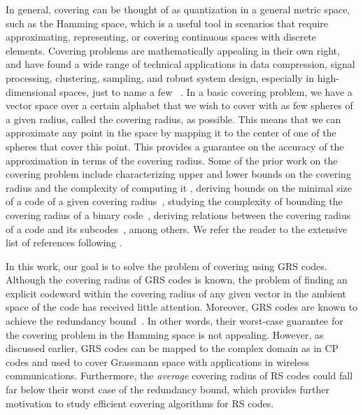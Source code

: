 \documentclass[conference]{IEEEtran}
\begin{document}

In general, covering can be thought of as quantization in a general metric space, such as the Hamming space, which is a useful tool in scenarios that require approximating, representing, or covering continuous spaces with discrete elements. Covering problems are mathematically appealing in their own right, and have found a wide range of technical applications in data compression, signal processing, clustering, sampling, and robust system design, especially in high-dimensional spaces, just to name a few~\cite{torquato10, toth22}%
. In a basic covering problem, we have a vector space over a certain alphabet that we wish to cover with as few spheres of a given radius, called the covering radius, as possible. This means that we can approximate any point in the space by mapping it to the center of one of the spheres that cover this point. This provides a guarantee on the accuracy of the approximation in terms of the covering radius. Some of the prior work on the covering problem include characterizing upper and lower bounds on the covering radius and the complexity of computing it \cite{Cohen85}, deriving bounds on the minimal size of a code of a given covering radius~\cite{Cohen86, vanLint88}, studying the complexity of bounding the covering radius of a binary code~\cite{Cohen97}, deriving relations between the covering radius of a code and its subcodes~\cite{Brualdi98}, among others. We refer the reader to the extensive list of references following \cite[Chapter~15]{Huffman03}. 

In this work, our goal is to solve the problem of covering using GRS codes. Although the covering radius of GRS codes is known, the problem of finding an explicit codeword within the covering radius of any given vector in the ambient space of the code has received little attention. 
Moreover, GRS codes are known to achieve the redundancy bound~\cite[Corollary~11.1.3]{Huffman03}. In other words, their worst-case guarantee for the covering problem in the Hamming space is not appealing. However, as discussed earlier, GRS codes can be mapped to the complex domain as in CP codes and used to cover Grassmann space with applications in wireless communications. Furthermore, the \textit{average} covering radius of RS codes could fall far below their worst case of the redundancy bound, which provides further motivation to study efficient covering algorithms for RS codes. 
\end{document}
